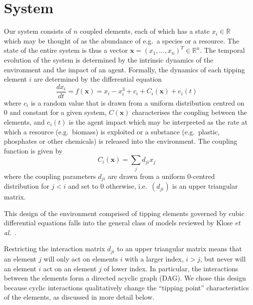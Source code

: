 \documentclass[conference]{IEEEtran}
\newcommand{\vectorsym}[1]{\ensuremath{\mathbf{#1}}}
\newcommand{\agentimpact}{\ensuremath{e}}
\newcommand{\couplingconstant}{\ensuremath{d}}
\newcommand{\couplingfunction}{\ensuremath{C}}
\begin{document}


\section{System}

Our system consists of $n$ coupled elements, each of which has a state
$x_i \in \mathbb{R}$ which may be thought of as the abundance of e.g.\
a species or a resource. The state of the entire system is thus a
vector $\vectorsym{x} = (x_1, \ldots, x_n)^T \in \mathbb{R}^n$. The
temporal evolution of the system is determined by the intrinsic
dynamics of the environment and the impact of an agent. Formally, the
dynamics of each tipping element $i$ are determined by the differential
equation
\begin{equation}
  \label{eq_coupledwithagent}
  \frac{dx_i}{dt} = f(\vectorsym{x}) = x_i - x_i^3 + c_i + \couplingfunction_i(\vectorsym{x}) + \agentimpact_i(t)
\end{equation}
where $c_i$ is a random value that is drawn from a uniform
distribution centred on $0$ and constant for a given system,
$C(\vectorsym{x})$ characterises the coupling  between the elements, and $\agentimpact_i(t)$ is
 the agent impact which may be interpreted as the rate at
which a resource (e.g.\ biomass) is exploited or a substance (e.g.\
plastic, phosphates or other chemicals) is released into the
environment. The coupling function is given by
\begin{equation}
  \label{eq_couplingfunction}
  \couplingfunction_i(\vectorsym{x}) = \sum_j \couplingconstant_{ji} x_j
\end{equation}
where the coupling parameters $\couplingconstant_{ji}$ are drawn from a uniform
$0$-centred distribution for $j < i$ and set to $0$ otherwise, i.e.\
$(\couplingconstant_{ji})$ is an upper triangular matrix.

This design of the environment comprised of tipping elements governed
by cubic differential equations falls into the general class of models
reviewed by Klose \textit{et al.}\
\cite{Klose2019_interactingtippingelements}.

Restricting the interaction matrix $\couplingconstant_{ji}$ to an upper triangular
matrix means that an element $j$ will only act on elements $i$ with a
larger index, $i>j$, but
never will an element $i$ act on an element $j$ of lower index. In
particular,  the interactions between the elements form a
directed acyclic graph (DAG). %
We chose this design because cyclic interactions qualitatively change
the ``tipping point'' characteristics of the elements, as discussed in
more detail below.
\end{document}
